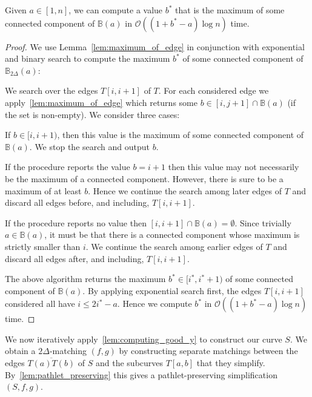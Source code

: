 \documentclass[a4paper,UKenglish,cleveref,thm-restate,notab]{lipics-v2021}
\newcommand{\bigO}{\mathcal{O}}
\newcommand{\B}{\mathbb{B}}
\begin{document}
    \begin{lemma}
        \label{lem:computing_good_y}
        Given $a \in [1, n]$, we can compute a value $b^*$ that is the maximum of some connected component of $\B(a)$ in $\bigO((1+b^*-a) \log n)$ time.
    \end{lemma}
    \begin{proof}
        We use Lemma~\ref{lem:maximum_of_edge} in conjunction with exponential and binary search to compute the maximum $b^*$ of some connected component of $\B_{2\Delta}(a)$:
        
        We search over the edges $T[i, i+1]$ of $T$.
        For each considered edge we apply~\cref{lem:maximum_of_edge} which returns some $b \in [i, j+1] \cap \B(a)$ (if the set is non-empty). We consider three cases:
        
        If $b \in [i, i+1)$, then this value is the maximum of some connected component of $\B(a)$. We stop the search and output $b$.
        
        If the procedure reports the value $b = i+1$ then this value may not necessarily be the maximum of a connected component.  However, there is sure to be a maximum of at least $b$. Hence we continue the search among later edges of $T$ and discard all edges before, and including, $T[i, i+1]$.
        
        If the procedure reports no value then $[i, i+1] \cap \B(a) = \emptyset$.
        Since trivially $a \in \B(a)$, it must be that there is a connected component whose maximum is strictly smaller than $i$.
        We continue the search among earlier edges of $T$ and discard all edges after, and including, $T[i, i+1]$.
        
        The above algorithm returns the maximum $b^* \in [i^*, i^*+1)$ of some connected component of $\B(a)$.
        By applying exponential search first, the edges $T[i, i+1]$ considered all have $i \leq 2i^* - a$.
        Hence we compute $b^*$ in $\bigO((1+b^*-a) \log n)$ time.
    \end{proof}
    
    We now iteratively apply~\cref{lem:computing_good_y} to construct our curve $S$.
    We obtain a $2\Delta$-matching $(f, g)$ by constructing separate matchings between the edges $\overline{T(a) T(b)}$ of $S$ and the subcurves $T[a, b]$ that they simplify.
    By~\cref{lem:pathlet_preserving} this gives a pathlet-preserving simplification $(S, f, g)$.

    \thmSimplification*

    
\end{document}
